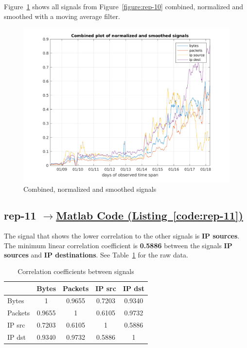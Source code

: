 \documentclass{article}
\newcommand{\codelink}[1]{%
    \hyperref[#1]{\quad$\rightarrow$\enskip Matlab Code (Listing~\ref{#1})}%
}
\begin{document}
Figure~\ref{figure:rep-10-optional} shows all signals from Figure~\ref{figure:rep-10} combined, normalized
and smoothed with a moving average filter.

\begin{figure}[h]
    \centering
    \includegraphics[width=\textwidth]{../exercise-3/plots/rep_10_optional}
    \caption{\label{figure:rep-10-optional} Combined, normalized and smoothed signals}
\end{figure}

\subsection{rep-11 \codelink{code:rep-11}}

The signal that shows the lower correlation to the other signals is \textbf{IP sources}. The minimum
linear correlation coefficient is \textbf{0.5886} between the signals \textbf{IP sources} and
\textbf{IP destinations}. See Table~\ref{table:rep-11} for the raw data.

\begin{table}[H]
    \centering
    \begin{tabular}{l|c|c|c|c}
                & Bytes  & Packets& IP src    & IP dst    \\
        \hline
        Bytes   & 1      & 0.9655 & 0.7203 & 0.9340 \\
        Packets & 0.9655 & 1      & 0.6105 & 0.9732 \\
        IP src     & 0.7203 & 0.6105 & 1      & 0.5886 \\
        IP dst     & 0.9340 & 0.9732 & 0.5886 & 1      \\
    \end{tabular}
    \caption{\label{table:rep-11} Correlation coefficients between signals}
\end{table}
\end{document}
